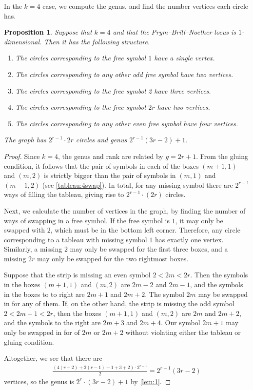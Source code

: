 \documentclass[11pt,reqno]{amsart}
\theoremstyle{definition}
\theoremstyle{problem}
\theoremstyle{plain}
\newtheorem{proposition}[definition]{Proposition}
\theoremstyle{remark}
\theoremstyle{theorem}
\numberwithin{equation}{section}
\numberwithin{figure}{section}
\begin{document}
In the $k=4$ case, we compute the genus, and find the number vertices each circle has.

\begin{proposition}
  \label{prop:k4dim1}
  Suppose that $k=4$ and that the Prym--Brill--Noether locus is $1$-dimensional. Then it has the following structure. 
  \begin{enumerate}[label=(\roman*)]
      \item The circles corresponding to the free symbol $1$ have a single vertex.
      \item The circles corresponding to any other odd free symbol have two vertices.
      \item The circles corresponding to the free symbol 2 have three vertices.
      \item The circles corresponding to the free symbol $2r$ have two vertices.
      \item The circles corresponding to any other even free symbol have four vertices.
  \end{enumerate}
  The graph has $2^{r-1}\cdot 2r$ circles and genus $2^{r-1}(3r-2)+1$.
\end{proposition}

\begin{proof}
 Since $k=4$, the genus and rank are related by $g=2r+1$. From the gluing condition, it follows that the pair of symbols in each of the boxes $(m+1,1)$ and $(m,2)$ is strictly bigger than the pair of symbols in $(m,1)$ and $(m-1,2)$ (see \cref{tableau:4swap}). In total, for any missing symbol there are $2^{r-1}$ ways of filling the tableau, giving rise to $2^{r-1}\cdot (2r)$ circles. 
 
 Next, we calculate the number of vertices in the graph, by finding the number of ways of swapping in a free symbol.
  If the free symbol is $1$, it may only be swapped with $2$, which must be in the bottom left corner. Therefore, any circle corresponding to a tableau with missing symbol $1$ has exactly one vertex. Similarly, a missing $2$ may only be swapped for the first three boxes, and a missing $2r$ may only be swapped for the two rightmost boxes.
  
Suppose that the strip is missing an even symbol $2<2m<2r$. Then the symbols in the boxes $(m+1,1)$ and $(m,2)$ are $2m-2$ and $2m-1$, and the symbols in the boxes to to right are $2m+1$ and $2m+2$. The symbol $2m$ may be swapped in for  any of them. 
If, on the other hand, the strip is missing the odd symbol $2<2m+1<2r$, then the boxes  $(m+1,1)$ and $(m,2)$ are $2m$ and $2m+2$, and the symbols to the right are $2m+3$ and $2m+4$. Our symbol $2m+1$ may only be swapped in for of $2m$ or $2m+2$ without violating either the tableau or gluing condition. 

Altogether, we see that there are 
  \begin{gather*}
\frac{(4(r-2) + 2(r-1) + 1 + 3 + 2) \cdot 2^{r-1}}{2} = 2^{r-1}(3r-2)
\end{gather*}
vertices, so the genus is $2^r\cdot (3r-2) + 1$ by \cref{lem:1}.
\end{proof}
\end{document}
